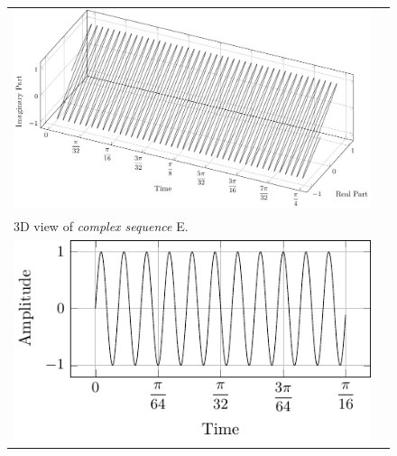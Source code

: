 \documentclass[../../course]{subfiles}
\begin{document}
\begin{figure} [H]

    \renewcommand{\arraystretch}{0.75}
    \centering
    \begin{NiceTabularX} {\textwidth} {
            *{2}{>{\centering\arraybackslash}X}
        }

         {
             {
                \includegraphics[height = \textheight] {tikzpics/plotComplexE.pdf}
            }
        }

        &
        \\

         {
            \vbox{
                 {3D view of \emph{complex sequence} E.}
                \label{plt:cmplxE}
            }
        }

        &
        \\

         {
             {
                \includegraphics[height = \textheight] {tikzpics/plotShortX2.pdf}
            }
        }

        &


\end{NiceTabularX}
\end{figure}
\end{document}
